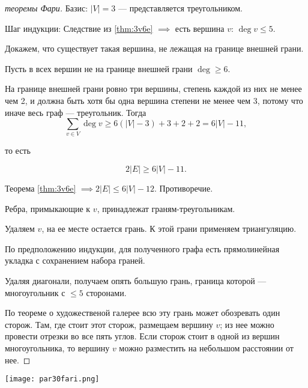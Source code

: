 \begin{proof}[ теоремы Фари]

    Базис: $|V| = 3$ --- представляется треугольником.

    Шаг индукции: Следствие из \ref*{thm:3v6e} $\implies$ есть вершина $v$: $\deg{v} \leq 5$.

    Докажем, что существует такая вершина, не лежащая на границе внешней грани.

    Пусть в всех вершин не на границе внешней грани $\deg \geq 6$.

    На границе внешней грани ровно три вершины, степень каждой из них не менее чем 2, и должна быть хотя бы одна вершина степени не менее чем 3, потому что иначе весь граф --- треугольник. Тогда
    \[ \sum_{v \in V} \deg v \geq 6(|V| - 3) + 3 + 2 + 2 = 6|V| - 11,\]

    то есть 
    
    \[2|E| \geq 6|V| - 11.\]
    
    Теорема \ref*{thm:3v6e} $\implies 2|E| \leq 6|V| - 12.$ Противоречие.

    Ребра, примыкающие к $v$, принадлежат граням-треугольникам.

    Удаляем $v$, на ее месте остается грань. К этой грани применяем триангуляцию.

    По предположению индукции, для полученного графа есть прямолинейная укладка с сохранением набора граней. 

    Удаляя диагонали, получаем опять большую грань, граница которой --- многоугольник с $\leq 5$ сторонами.
    
    По теореме о художественой галерее всю эту грань может обозревать один сторож. Там, где стоит этот сторож, размещаем вершину $v$; из нее можно провести отрезки во все пять углов. Если сторож стоит в одной из вершин многоугольника, то вершину $v$ можно разместить на небольшом расстоянии от нее.
\end{proof}

\begin{center}
    \texttt{[image: par30fari.png]}
\end{center}